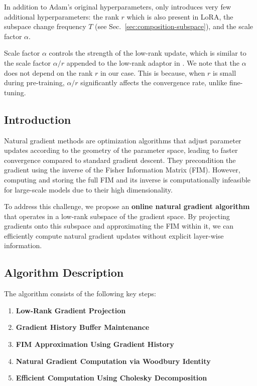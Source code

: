 In addition to Adam's original hyperparameters, \lowrank{} only introduces very few additional hyperparameters: the rank $r$ which is also present in LoRA, the subspace change frequency $T$ (see Sec.~\ref{sec:composition-subspace}), and the scale factor $\alpha$. 

Scale factor $\alpha$ controls the strength of the low-rank update, which is similar to the scale factor $\alpha/r$ appended to the low-rank adaptor in \citet{huLoRALowRankAdaptation2021}.
We note that the $\alpha$ does not depend on the rank $r$ in our case. 
This is because, when $r$ is small during pre-training, $\alpha/r$ significantly affects the convergence rate, unlike fine-tuning.






\subsection{Introduction}

Natural gradient methods are optimization algorithms that adjust parameter updates according to the geometry of the parameter space, leading to faster convergence compared to standard gradient descent. They precondition the gradient using the inverse of the Fisher Information Matrix (FIM). However, computing and storing the full FIM and its inverse is computationally infeasible for large-scale models due to their high dimensionality.

To address this challenge, we propose an \textbf{online natural gradient algorithm} that operates in a low-rank subspace of the gradient space. By projecting gradients onto this subspace and approximating the FIM within it, we can efficiently compute natural gradient updates without explicit layer-wise information.

\subsection{Algorithm Description}

The algorithm consists of the following key steps:

\begin{enumerate}
    \item \textbf{Low-Rank Gradient Projection}
    \item \textbf{Gradient History Buffer Maintenance}
    \item \textbf{FIM Approximation Using Gradient History}
    \item \textbf{Natural Gradient Computation via Woodbury Identity}
    \item \textbf{Efficient Computation Using Cholesky Decomposition}
\end{enumerate}

